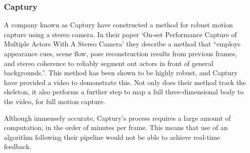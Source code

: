 \subsubsection{Captury}

A company known as Captury\cite{captury} have constructed a method for robust motion capture using a stereo camera. In their paper `On-set Performance Capture of Multiple Actors With A Stereo Camera'\cite{capturystereopaper} they describe a method that ``employs appearance cues, scene flow, pose reconstruction results from previous frames, and stereo coherence to reliably segment out actors in front of general backgrounds.''. This method has been shown to be highly robust, and Captury have provided a video\cite{capturyvideo} to demonstrate this. Not only does their method track the skeleton, it also performs a further step to map a full three-dimensional body to the video, for full motion capture.

Although immensely accurate, Captury's process requires a large amount of computation, in the order of minutes per frame. This means that use of an algorithm following their pipeline would not be able to achieve real-time feedback.